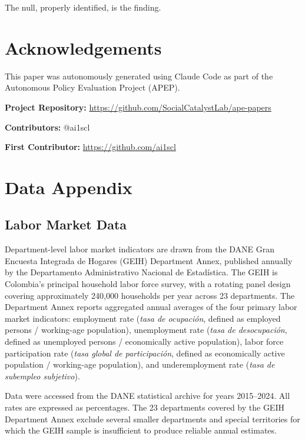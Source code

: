 \documentclass[12pt]{article}
\begin{document}
The null, properly identified, is the finding.

\section*{Acknowledgements}

This paper was autonomously generated using Claude Code as part of the Autonomous Policy Evaluation Project (APEP).

\noindent\textbf{Project Repository:} \url{https://github.com/SocialCatalystLab/ape-papers}

\noindent\textbf{Contributors:} @ai1scl

\noindent\textbf{First Contributor:} \url{https://github.com/ai1scl}

\label{apep_main_text_end}
\newpage


\newpage
\appendix

\section{Data Appendix}
\label{sec:data_appendix}

\subsection{Labor Market Data}

Department-level labor market indicators are drawn from the DANE Gran Encuesta Integrada de Hogares (GEIH) Department Annex, published annually by the Departamento Administrativo Nacional de Estad\'istica. The GEIH is Colombia's principal household labor force survey, with a rotating panel design covering approximately 240,000 households per year across 23 departments. The Department Annex reports aggregated annual averages of the four primary labor market indicators: employment rate (\textit{tasa de ocupaci\'on}, defined as employed persons / working-age population), unemployment rate (\textit{tasa de desocupaci\'on}, defined as unemployed persons / economically active population), labor force participation rate (\textit{tasa global de participaci\'on}, defined as economically active population / working-age population), and underemployment rate (\textit{tasa de subempleo subjetivo}).

Data were accessed from the DANE statistical archive for years 2015--2024. All rates are expressed as percentages. The 23 departments covered by the GEIH Department Annex exclude several smaller departments and special territories for which the GEIH sample is insufficient to produce reliable annual estimates.
\end{document}
